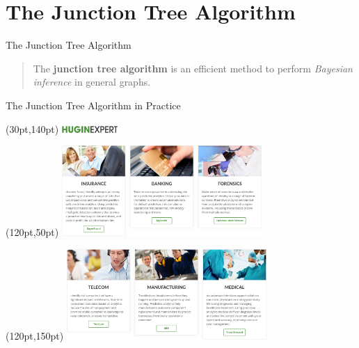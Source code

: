 \documentclass[10pt,usenames,dvipsnames]{beamer}
\begin{document}
\section{The Junction Tree Algorithm}

\begin{frame}{The Junction Tree Algorithm}
    \begin{quote} 
      The \textbf{junction tree algorithm} is an efficient method to perform
      \textit{Bayesian inference} in general graphs.
    \end{quote}
\end{frame}

\begin{frame}{The Junction Tree Algorithm in Practice}
  \begin{textblock*}{10pt}(30pt,140pt)
    \includegraphics[width=60pt]{figures/hugin-expert/hugin-expert.png}
  \end{textblock*}
  \begin{textblock*}{10pt}(120pt,50pt)
    \includegraphics[width=215pt]{figures/hugin-expert/industry-applications-1.png}
  \end{textblock*}
  \begin{textblock*}{10pt}(120pt,150pt)
    \includegraphics[width=215pt]{figures/hugin-expert/industry-applications-2.png}
  \end{textblock*}
\end{frame}
\end{document}
